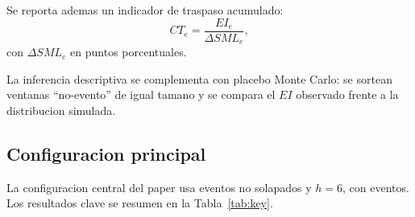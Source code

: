 Se reporta ademas un indicador de traspaso acumulado:
\begin{equation}
CT_e = \frac{EI_e}{\Delta SML_e},
\end{equation}
con $\Delta SML_e$ en puntos porcentuales.

La inferencia descriptiva se complementa con placebo Monte Carlo: se sortean ventanas ``no-evento'' de igual tamano y se compara el $EI$ observado frente a la distribucion simulada.

\subsection{Configuracion principal}

La configuracion central del paper usa eventos no solapados y $h=6$, con \nEventosMain{} eventos. Los resultados clave se resumen en la Tabla~\ref{tab:key}.

\begin{table}[H]
\centering
\caption{Resultados clave de la especificacion principal}
\label{tab:key}

\end{table}

